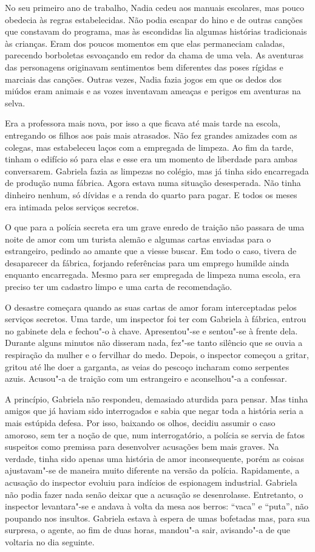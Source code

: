 No seu primeiro ano de trabalho, Nadia cedeu aos manuais escolares, mas
pouco obedecia às regras estabelecidas. Não podia escapar do hino e de
outras canções que constavam do programa, mas às escondidas lia algumas histórias tradicionais às crianças. Eram dos poucos momentos em que
elas permaneciam caladas, parecendo borboletas esvoaçando em redor da
chama de uma vela. As aventuras das personagens originavam sentimentos
bem diferentes das poses rígidas e marciais das canções. Outras vezes,
Nadia fazia jogos em que os dedos dos miúdos eram animais e as vozes
inventavam ameaças e perigos em aventuras na selva.

Era a professora mais nova, por isso a que ficava até mais tarde na
escola, entregando os filhos aos pais mais atrasados. Não fez grandes
amizades com as colegas, mas estabeleceu laços com a empregada de
limpeza. Ao fim da tarde, tinham o edifício só para elas e esse era um
momento de liberdade para ambas conversarem. Gabriela fazia as limpezas
no colégio, mas já tinha sido encarregada de produção numa fábrica.
Agora estava numa
situação desesperada. Não tinha dinheiro nenhum, só dívidas e a renda do
quarto para pagar. E todos os meses era intimada pelos serviços
secretos.

O que para a polícia secreta era um grave enredo de traição não passara
de uma noite de amor com um turista alemão e algumas cartas enviadas
para o estrangeiro, pedindo ao amante que a viesse buscar. Em todo o
caso, tivera de desaparecer da fábrica, forjando referências para um
emprego humilde ainda enquanto encarregada. Mesmo para ser empregada de
limpeza numa escola, era preciso ter um cadastro limpo e uma carta de
recomendação.

O desastre começara quando as suas cartas de amor foram interceptadas
pelos serviços secretos. Uma tarde, um inspector foi ter com Gabriela à
fábrica, entrou no gabinete dela e fechou"-o à chave. Apresentou"-se e
sentou"-se à frente dela. Durante alguns minutos não disseram nada, fez"-se
tanto silêncio que se ouvia a respiração da mulher e o fervilhar do
medo. Depois, o inspector começou a gritar, gritou até lhe doer a
garganta, as veias do pescoço incharam como serpentes azuis. Acusou"-a de
traição com um estrangeiro e aconselhou"-a a confessar.

A princípio,
Gabriela não respondeu, demasiado aturdida para pensar. Mas tinha
amigos que já haviam sido interrogados e sabia que negar toda a história
seria a mais estúpida defesa. Por isso, baixando os olhos, decidiu assumir o caso amoroso, sem ter a noção de que, num interrogatório, a
polícia se servia de fatos suspeitos como premissa para desenvolver
acusações bem mais graves. Na verdade, tinha sido apenas uma história de
amor inconsequente, porém as coisas ajustavam"-se de maneira muito
diferente na
versão da polícia. Rapidamente, a acusação do inspector evoluiu para
indícios de espionagem industrial. Gabriela não podia fazer nada senão
deixar que a acusação se desenrolasse. Entretanto, o inspector
levantara"-se e andava à volta da mesa aos berros: ``vaca'' e ``puta'', não
poupando nos insultos. Gabriela estava à espera de umas bofetadas mas,
para sua surpresa, o agente, ao fim de duas horas, mandou"-a sair,
avisando"-a de que voltaria no dia seguinte.

